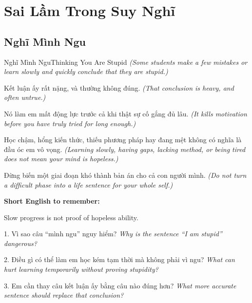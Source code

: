 \chapter{Sai Lầm Trong Suy Nghĩ}

\section{Nghĩ Mình Ngu}
\begin{truyen}{Nghĩ Mình Ngu}{Thinking You Are Stupid}
\textit{(Some students make a few mistakes or learn slowly and quickly conclude that they are stupid.)}

Kết luận ấy rất nặng, và thường không đúng.
\textit{(That conclusion is heavy, and often untrue.)}

Nó làm em mất động lực trước cả khi thật sự cố gắng đủ lâu.
\textit{(It kills motivation before you have truly tried for long enough.)}

Học chậm, hổng kiến thức, thiếu phương pháp hay đang mệt không có nghĩa là đầu óc em vô vọng.
\textit{(Learning slowly, having gaps, lacking method, or being tired does not mean your mind is hopeless.)}
\end{truyen}

\begin{baihoc}
Đừng biến một giai đoạn khó thành bản án cho cả con người mình.
\textit{(Do not turn a difficult phase into a life sentence for your whole self.)}
\end{baihoc}

\begin{ghinhoanh}
\textbf{Short English to remember:}

Slow progress is not proof of hopeless ability.

\end{ghinhoanh}

\begin{tuhocnhanh}
1. Vì sao câu “mình ngu” nguy hiểm? \textit{Why is the sentence “I am stupid” dangerous?}

2. Điều gì có thể làm em học kém tạm thời mà không phải vì ngu? \textit{What can hurt learning temporarily without proving stupidity?}

3. Em cần thay câu kết luận ấy bằng câu nào đúng hơn? \textit{What more accurate sentence should replace that conclusion?}
\end{tuhocnhanh}
\ngancach

